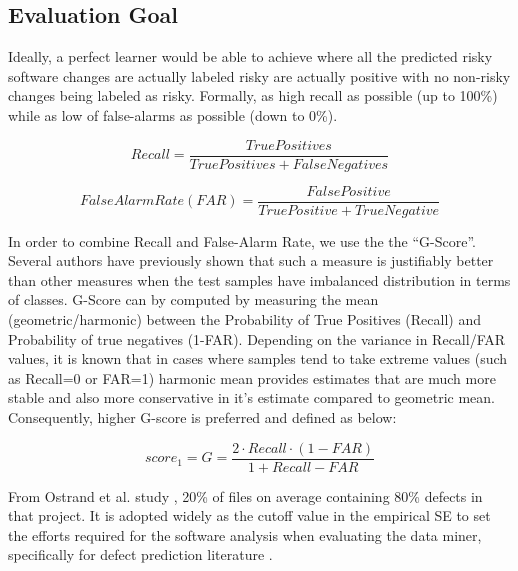 \documentclass[sigconf,review, anonymous]{acmart}
\begin{document}
\subsection{Evaluation Goal}

Ideally, a perfect learner would be able to achieve where all the predicted risky software changes are actually labeled risky are actually positive with no non-risky changes being labeled as risky. Formally, as high recall as possible (up to 100\%) while as low of  false-alarms as possible (down to 0\%). 

\vspace{-5pt}
\begin{equation}
 \mathit{Recall} = \frac{\mathit{TruePositives}}{\mathit{TruePositives} + \mathit{FalseNegatives}}
 \end{equation}
 \vspace{-10pt}
 
\begin{equation}
 \mathit{FalseAlarm Rate(FAR)} = \frac{\mathit{FalsePositive}}{\mathit{TruePositive} + \mathit{TrueNegative}}
 \end{equation}

In order to combine Recall and False-Alarm Rate, we use the the ``G-Score''. Several authors \cite{shatnawi10g1, comments07} have previously shown
that such a measure is justifiably better than other measures
when the test samples have imbalanced distribution in terms
of classes.  G-Score can by computed by measuring the mean
(geometric/harmonic) between the Probability of True Positives
(Recall) and Probability of true negatives (1-FAR). Depending on the variance in Recall/FAR values, it is known that in cases where samples tend to take extreme values (such as Recall=0 or FAR=1)
harmonic mean provides estimates that are much more stable and
also more conservative in it's estimate compared to geometric
mean. Consequently, higher G-score is preferred and defined as below:

\begin{equation}
 \mathit{score_1}=\mathit{G} = \frac{2 \cdot \mathit{Recall} \cdot \mathit{(1 - FAR)} }{1 + \mathit{Recall} - \mathit{FAR}}
 \end{equation}

From Ostrand et al. study \cite{ostrand05_predicting}, 20\% of files on average containing 80\% defects in that project. It is adopted widely as the cutoff value in the empirical SE to set the efforts required for the software analysis when evaluating the data miner, specifically for defect prediction literature \cite{menzies07dp, kamei12_jit, yang16effort, monden13cost, mende10effort}. 
\end{document}

